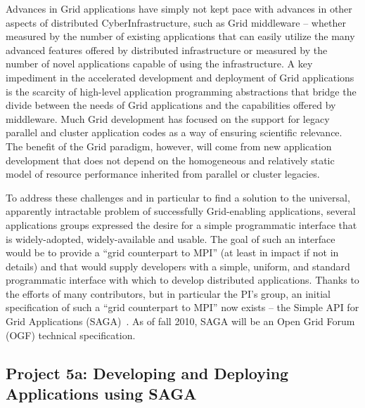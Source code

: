 \documentclass[a4paper,10pt]{article}
\begin{document}

Advances in Grid applications have simply not kept pace with advances in other aspects of 
distributed CyberInfrastructure, such as Grid middleware -- whether measured by the number of 
existing applications that can easily utilize the many advanced features offered by distributed 
infrastructure or measured by the number of novel applications capable of using the 
infrastructure. A key impediment in the accelerated development and deployment of Grid 
applications is the scarcity of high-level application programming abstractions that bridge the 
divide between the needs of Grid applications and the capabilities offered by middleware.  Much 
Grid development has focused on the support for legacy parallel and cluster application codes 
as a way of ensuring scientific relevance.  The benefit of the Grid paradigm, however, will 
come from new application development that does not depend on the homogeneous and relatively 
static model of resource performance inherited from parallel or cluster legacies.  %

To address these challenges and in particular to find a solution to the universal, apparently 
intractable problem of successfully Grid-enabling applications, several applications groups 
expressed the desire for a simple programmatic interface that is widely-adopted, widely-available 
and usable. The goal of such an interface would be to provide a ``grid counterpart to MPI'' (at 
least in impact if not in details) and that would supply developers with a simple, uniform, and 
standard programmatic interface with which to develop distributed applications.  Thanks to the 
efforts of many contributors, but in particular the PI's group, an initial specification of 
such a ``grid counterpart to MPI'' now exists -- the Simple API for Grid Applications 
(SAGA)~\cite{saga_url}. As of fall 2010, SAGA will be an Open Grid Forum (OGF) technical 
specification.


\subsection*{Project 5a: Developing and Deploying Applications using SAGA}
\end{document}
